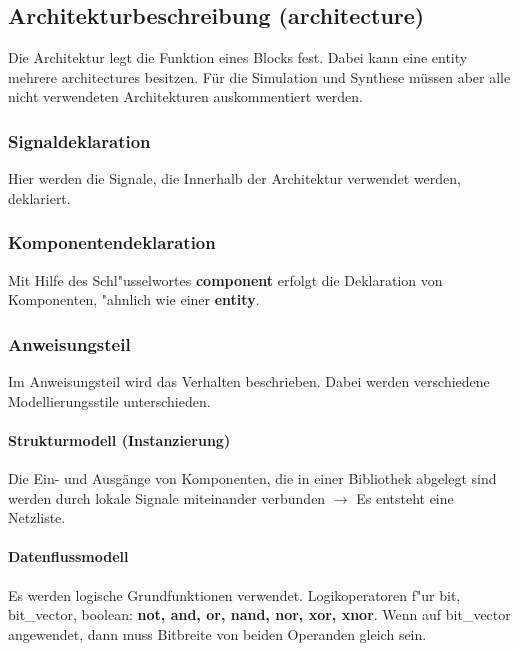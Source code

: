 	
\subsection{Architekturbeschreibung (architecture)}
	Die Architektur legt die Funktion eines Blocks fest. Dabei kann eine entity mehrere architectures besitzen. Für die Simulation und Synthese müssen aber alle nicht verwendeten Architekturen auskommentiert werden.
	

\begin{multicols}{2}
	\subsubsection{Signaldeklaration}
	 Hier werden die Signale, die Innerhalb der Architektur verwendet werden, deklariert.
		
	\vfill\null
	\columnbreak
	\subsubsection{Komponentendeklaration}
		Mit Hilfe des Schl"usselwortes \textbf{component} erfolgt die Deklaration von Komponenten, "ahnlich wie einer \textbf{entity}.\\
		
\end{multicols}

\newpage	
\subsubsection{Anweisungsteil}
	Im Anweisungsteil wird das Verhalten beschrieben. Dabei werden verschiedene Modellierungsstile unterschieden.
	
\begin{multicols}{2}
	\paragraph{Strukturmodell (Instanzierung)}
	Die Ein- und Ausgänge von Komponenten, die in einer Bibliothek abgelegt sind werden durch lokale Signale miteinander verbunden $\rightarrow$ Es entsteht eine Netzliste. 
	
	
	\paragraph{Datenflussmodell}
	Es werden logische Grundfunktionen verwendet.
	Logikoperatoren f"ur bit, bit\_vector, boolean: \textbf{not, and, or, nand, nor, xor, xnor}. Wenn auf bit\_vector angewendet, dann muss Bitbreite von beiden Operanden gleich sein.
	
			
\end{multicols}

